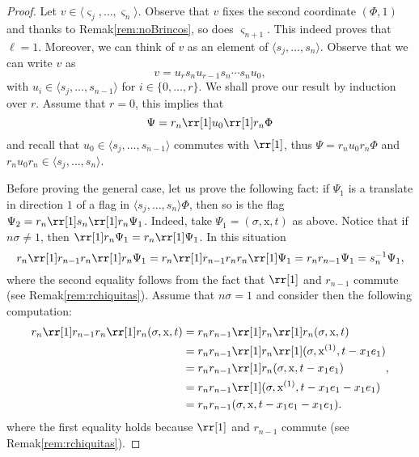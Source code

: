 \documentclass[final]{amsart}
\theoremstyle{plain}
\theoremstyle{definition}
\theoremstyle{remark}
\numberwithin{equation}{section}
\renewcommand{\{}{\lbrace}
\renewcommand{\}}{\rbrace}
\newcommand{\cyvec}[1]{{\mathrm{#1}}}
\newcommand{\vx}{\cyvec{x}}
\newcommand{\es}{\varsigma}
\begin{document}
\begin{proof}
  Let $v \in \langle \es_{j}, \dots, \es_{n}\rangle$. 
  Observe that $v$ fixes the second coordinate $(\Phi, 1)$ and thanks to Remak\nobreakspace \ref {rem:noBrincos}, so does $\es_{n+1}$.
  This indeed proves that $\ell = 1$.
  Moreover, we can think of $v$  as an element of $\langle s_{j}, \dots, s_{n} \rangle$.  
  Observe that we can write $v$ as 
  \[v=u_{r}s_{n} u_{r-1} s_{n} \cdots s_{n} u_{0},\] 
  with $u_{i} \in \langle s_{j}, \dots, s_{n-1} \rangle$ for $i \in \{0, \dots, r\}$. 
  We shall prove our result by induction over $r$.
  Assume that $r=0$, this implies that  \[\Psi = r_n \rr[1] u_0 \rr[1] r_n \Phi\] and recall that $u_0 \in \langle s_j, \dots, s_{n-1} \rangle$ commutes with $\rr[1]$, thus $\Psi = r_n u_0 r_n \Phi$ and $r_n u_0 r_n \in \langle s_j, \dots, s_{n} \rangle$. 

  Before proving the general case, let us prove the following fact: if $\Psi_1$ is a translate in direction $1$ of a flag in  $\langle s_{j}, \dots, s_{n} \rangle \Phi$, then so is  the flag $\Psi_2 = r_{n} \rr[1] s_{n} \rr[1] r_{n} \Psi_1$.
  Indeed, take $\Psi_1 = (\sigma, \vx, t)$ as above. 
  Notice that if $n \sigma \neq 1$, then $\rr[1] r_{n} \Psi_1 = r_{n} \rr[1] \Psi_1$. 
  In this situation \[r_{n} \rr[1] r_{n-1} r_{n} \rr[1] r_{n} \Psi_1 = r_{n} \rr[1] r_{n-1} r_{n}  r_{n} \rr[1] \Psi_1 = r_{n} r_{n-1}\Psi_1 = s_{n}^{-1} \Psi_1,\] where the second equality follows from the fact that $\rr[1]$ and $r_{n-1}$ commute (see Remak\nobreakspace \ref {rem:rchiquitas}). 
  Assume that  $n \sigma = 1$ and consider then the following computation:
	\[\begin{aligned}
		r_{n} \rr[1] r_{n-1} r_{n} \rr[1] r_{n} (\sigma, \vx, t) &= r_{n} r_{n-1} \rr[1]  r_{n} \rr[1] r_{n} (\sigma, \vx, t) \\ &=  r_{n} r_{n-1} \rr[1]  r_{n} \rr[1] (\sigma, \vx^{(1)}, t-x_{1}e_{1}) \\
		&= r_{n} r_{n-1} \rr[1]  r_{n} (\sigma, \vx, t-x_{1}e_{1})\\
		&= r_{n} r_{n-1} \rr[1]  (\sigma, \vx^{(1)}, t-x_{1}e_{1}- x_{1} e_{1}) \\
		&= r_{n} r_{n-1} (\sigma, \vx, t-x_{1}e_{1}- x_{1} e_{1}). \\
	 \end{aligned},\]
  where the first equality holds because $\rr[1]$ and $r_{n-1}$ commute (see Remak\nobreakspace \ref {rem:rchiquitas}).
  

\end{proof}
\end{document}
